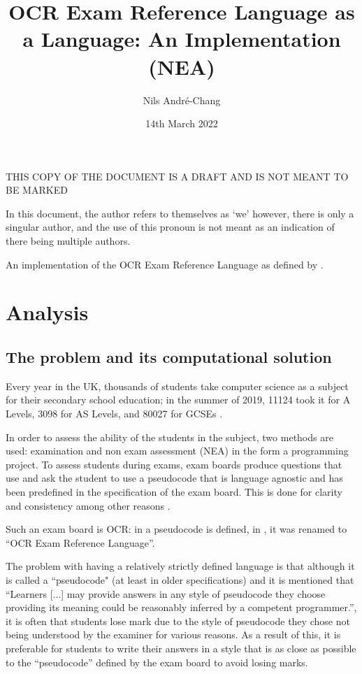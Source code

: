 \documentclass{article}
\author{Nils André-Chang}
\title{OCR Exam Reference Language as a Language: An Implementation (NEA)}
\date{14th March 2022}
\begin{document}
{\huge THIS COPY OF THE DOCUMENT IS A DRAFT AND IS NOT MEANT TO BE MARKED}

\maketitle

\tableofcontents

\listoffigures

\listoflistings

\listoftables

In this document, the author refers to themselves as `we' however, there is
only a singular author, and the use of this pronoun is not meant as an
indication of there being multiple authors.

An implementation of the OCR Exam Reference Language as defined by
\textcite{j277, h446}.

\section{Analysis}

\subsection{The problem and its computational solution}

Every year in the UK, thousands of students take computer science as a subject
for their secondary school education; in the summer of 2019, 11124 took it for
A Levels, 3098 for AS Levels, and 80027 for GCSEs
\cite{jcqalevel19, jcqgcse19}.

In order to assess the ability of the students in the subject, two methods are
used: examination and non exam assessment (NEA) in the form a programming
project. To assess students during exams, exam boards produce questions that
use and ask the student to use a pseudocode that is language agnostic and has
been predefined in the specification of the exam board. This is done for
clarity and consistency among other reasons \cite{h446, j276, j277}.

Such an exam board is OCR: in \textcite{h446, j276, j277} a pseudocode is
defined, in \textcite{j277}, it was renamed to ``OCR Exam Reference Language''.

The problem with having a relatively strictly defined language is that although
it is called a ``pseudocode" (at least in older specifications) and it is
mentioned that ``Learners [...] may provide answers in any style of pseudocode
they choose providing its meaning could be reasonably inferred by a competent
programmer.'', it is often that students lose mark due to the style of
pseudocode they chose not being understood by the examiner for various reasons.
As a result of this, it is preferable for students to write their answers in a
style that is as close as possible to the ``pseudocode'' defined by the exam
board to avoid losing marks.
\end{document}
